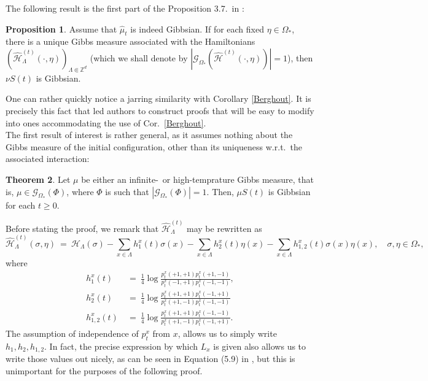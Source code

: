 \documentclass[12pt]{article}
\newcommand{\G}{\mathcal{G}}
\renewcommand{\H}{\mathcal{H}}
\newcommand{\Z}{\mathbb{Z}}
\newcommand{\pika}{\boldsymbol{\cdot}}
\newcommand{\1}{\mathbbm{1}}
\newcommand{\5}{\vspace{0.5cm}}
\renewcommand{\hat}{\widehat}
\theoremstyle{definition}
\newtheorem{thm}{Theorem}[section]
\newtheorem{prop}[thm]{Proposition}
\begin{document}
The following result is the first part of the Proposition 3.7.~in \cite{EFHR}:
\begin{prop}\label{BerghoutAnalogue}
Assume that $\hat{\mu}_t$ is indeed Gibbsian. If for each fixed $\eta\in\Omega_*$, there is a unique Gibbs measure associated with the Hamiltonians $(\hat{\H}_\Lambda^{(t)}(\pika,\eta))_{\Lambda\Subset\Z^d}$ (which we shall denote by $|\G_{\Omega_*}(\hat{\H}^{(t)}(\pika,\eta))|=1$), then $\nu S(t)$ is Gibbsian.
\end{prop}
One can rather quickly notice a jarring similarity with Corollary \ref{Berghout}. It is precisely this fact that led authors to construct proofs that will be easy to modify into ones accommodating the use of Cor.~\ref{Berghout}. \\

The first result of interest is rather general, as it assumes nothing about the Gibbs measure of the initial configuration, other than its uniqueness w.r.t.~the associated interaction:

\begin{thm}\label{HighTempTHM}
Let $\mu$ be either an infinite-~or high-temprature Gibbs measure, that is, $\mu\in\G_{\Omega_*}(\Phi)$, where $\Phi$ is such that $|\G_{\Omega_*}(\Phi)|=1$. Then, $\mu S(t)$ is Gibbsian for each $t\geq 0$.
\end{thm}

Before stating the proof, we remark that $\hat{\H}_\Lambda^{(t)}$ may be rewritten as
$$\hat{\H}_\Lambda^{(t)}(\sigma,\eta) ~=~ \H_\Lambda(\sigma) - \sum_{x\in\Lambda}h_1^x(t)\sigma(x) - \sum_{x\in\Lambda}h_2^x(t)\eta(x) - \sum_{x\in\Lambda}h_{1,2}^x(t)\sigma(x)\eta(x), \quad \sigma,\eta\in\Omega_*,$$
where 
\begin{align*}
h_1^x(t) ~&=~ \frac{1}{4}\log\frac{p_t^x(+1,+1)p_t^x(+1,-1)}{p_t^x(-1,+1)p_t^x(-1,-1)}, \\
h_2^x(t) ~&=~ \frac{1}{4}\log\frac{p_t^x(+1,+1)p_t^x(-1,+1)}{p_t^x(+1,-1)p_t^x(-1,-1)} \\
h_{1,2}^x(t) ~&=~ \frac{1}{4}\log\frac{p_t^{x}(+1,+1)p_t^x(-1,-1)}{p_t^x{(+1,-1)}p_t^{x}(-1,+1)}.
\end{align*}
The assumption of independence of $p_t^x$ from $x$, allows us to simply write $h_1,h_2,h_{1,2}$. In fact, the precise expression by which $L_x$ is given also allows us to write those values out nicely, as can be seen in Equation (5.9) in \cite{EFHR}, but this is unimportant for the purposes of the following proof.
\end{document}
